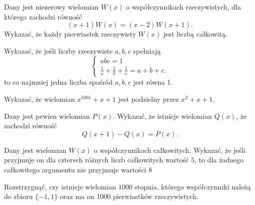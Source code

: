 \begin{problem}{1}
	Dany jest niezerowy wielomian $W(x)$ o współczynnikach rzeczywistych, dla którego zachodzi równość
	\[
		(x + 1)W(x) = (x - 2)W(x + 1).
	\]
	Wykazać, że każdy pierwiastek rzeczywisty $W(x)$ jest liczbą całkowitą.
\end{problem}


\begin{problem}{2}
	Wykazać, że jeśli liczby rzeczywiste $a, b, c$ spełniają
    \[
    \begin{cases}
        abc = 1 \\
        \frac{1}{a} + \frac{1}{b} + \frac{1}{c} = a + b + c.
    \end{cases}
    \]
    to co najmniej jedna liczba spośród $a, b, c$ jest równa 1.
\end{problem}

\begin{problem}{3}
	Wykazać, że wielomian $x^{1001} + x + 1$ jest podzielny przez $x^2 + x + 1$.
\end{problem}


\begin{problem}{4}
	Dany jest pewien wielomian $P(x)$. Wykazać, że istnieje wielomian $Q(x)$, że zachodzi równość
	\[
		Q(x + 1) - Q(x) = P(x).
	\]
\end{problem}

\begin{problem}{5}
	Dany jest wielomian $W(x)$ o współczynnikach całkowitych. Wykazać, że jeśli przyjmuje on dla czterech różnych liczb całkowitych wartość $5$, to dla żadnego całkowitego argumentu nie przyjmuje wartości $8$
\end{problem}

\begin{problem}{7}
	Rozstrzygnąć, czy istnieje wielomian $1000$ stopnia, którego współczynniki należą do zbioru $\{-1, 1\}$ oraz ma on $1000$ pierwiastków rzeczywistych.
\end{problem}

